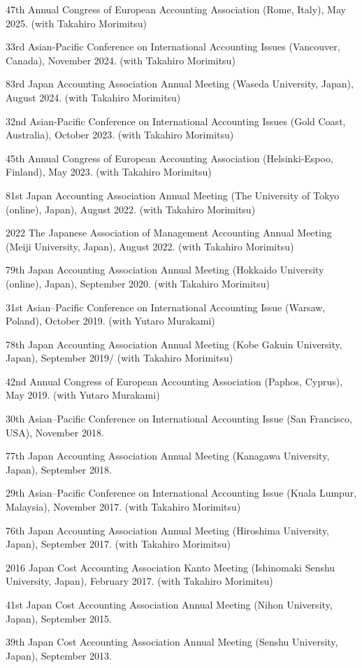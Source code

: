 \documentclass[letterpaper,uplatex]{article}
\renewenvironment{itemize}{
  \begin{list}{}{
    \setlength{\leftmargin}{1.5em}
  }
}{
  \end{list}
}
\begin{document}
\begin{itemize}
    \item 47th Annual Congress of European Accounting Association (Rome, Italy), May 2025. (with Takahiro Morimitsu)
    \item 33rd Asian-Pacific Conference on International Accounting Issues (Vancouver, Canada), November 2024. (with Takahiro Morimitsu)
    \item 83rd Japan Accounting Association Annual Meeting (Waseda University, Japan), August 2024. (with Takahiro Morimitsu)
    \item 32nd Asian-Pacific Conference on International Accounting Issues (Gold Coast, Australia), October 2023. (with Takahiro Morimitsu)
   \item 45th Annual Congress of European Accounting Association (Helsinki-Espoo, Finland), May 2023. (with Takahiro Morimitsu)
   \item 81st Japan Accounting Association Annual Meeting (The University of Tokyo (online), Japan), August 2022. (with Takahiro Morimitsu)
   \item 2022 The Japanese Association of Management Accounting Annual Meeting (Meiji University, Japan), August 2022. (with Takahiro Morimitsu)
  \item 79th Japan Accounting Association Annual Meeting (Hokkaido University (online), Japan), September 2020. (with Takahiro Morimitsu)
  \item 31st Asian--Pacific Conference on International Accounting Issue (Warsaw, Poland), October 2019. (with Yutaro Murakami)
  \item 78th Japan Accounting Association Annual Meeting (Kobe Gakuin University, Japan), September 2019/ (with Takahiro Morimitsu)
  \item 42nd Annual Congress of European Accounting Association (Paphos, Cyprus), May 2019. (with Yutaro Murakami)
  \item 30th Asian--Pacific Conference on International Accounting Issue (San Francisco, USA), November 2018.
  \item 77th Japan Accounting Association Annual Meeting (Kanagawa University, Japan), September 2018.
  \item 29th Asian--Pacific Conference on International Accounting Issue (Kuala Lumpur, Malaysia), November 2017. (with Takahiro Morimitsu)
  \item 76th Japan Accounting Association Annual Meeting (Hiroshima University, Japan), September 2017. (with Takahiro Morimitsu)
  \item 2016 Japan Cost Accounting Association Kanto Meeting (Ishinomaki Senshu University, Japan), February 2017. (with Takahiro Morimitsu)
  \item 41st Japan Cost Accounting Association Annual Meeting (Nihon University, Japan), September 2015.
  \item 39th Japan Cost Accounting Association Annual Meeting (Senshu University, Japan), September 2013.
\end{itemize}
\end{document}
